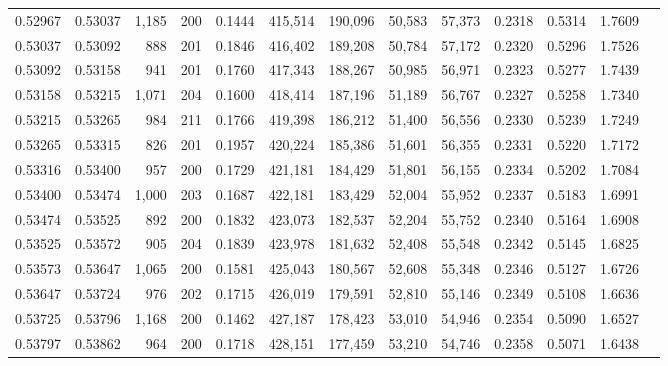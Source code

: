 \begin{tabular}{rrrrrrrrrrrrr}
0.52967 & 0.53037 & 1,185 & 200 &                                     0.1444 & 415,514 & 190,096 &  50,583 &  57,373 & 0.2318 & 0.5314 & 1.7609 \\
0.53037 & 0.53092 &   888 & 201 &                                     0.1846 & 416,402 & 189,208 &  50,784 &  57,172 & 0.2320 & 0.5296 & 1.7526 \\
0.53092 & 0.53158 &   941 & 201 &                                     0.1760 & 417,343 & 188,267 &  50,985 &  56,971 & 0.2323 & 0.5277 & 1.7439 \\
0.53158 & 0.53215 & 1,071 & 204 &                                     0.1600 & 418,414 & 187,196 &  51,189 &  56,767 & 0.2327 & 0.5258 & 1.7340 \\
0.53215 & 0.53265 &   984 & 211 &                                     0.1766 & 419,398 & 186,212 &  51,400 &  56,556 & 0.2330 & 0.5239 & 1.7249 \\
0.53265 & 0.53315 &   826 & 201 &                                     0.1957 & 420,224 & 185,386 &  51,601 &  56,355 & 0.2331 & 0.5220 & 1.7172 \\
0.53316 & 0.53400 &   957 & 200 &                                     0.1729 & 421,181 & 184,429 &  51,801 &  56,155 & 0.2334 & 0.5202 & 1.7084 \\
0.53400 & 0.53474 & 1,000 & 203 &                                     0.1687 & 422,181 & 183,429 &  52,004 &  55,952 & 0.2337 & 0.5183 & 1.6991 \\
0.53474 & 0.53525 &   892 & 200 &                                     0.1832 & 423,073 & 182,537 &  52,204 &  55,752 & 0.2340 & 0.5164 & 1.6908 \\
0.53525 & 0.53572 &   905 & 204 &                                     0.1839 & 423,978 & 181,632 &  52,408 &  55,548 & 0.2342 & 0.5145 & 1.6825 \\
0.53573 & 0.53647 & 1,065 & 200 &                                     0.1581 & 425,043 & 180,567 &  52,608 &  55,348 & 0.2346 & 0.5127 & 1.6726 \\
0.53647 & 0.53724 &   976 & 202 &                                     0.1715 & 426,019 & 179,591 &  52,810 &  55,146 & 0.2349 & 0.5108 & 1.6636 \\
0.53725 & 0.53796 & 1,168 & 200 &                                     0.1462 & 427,187 & 178,423 &  53,010 &  54,946 & 0.2354 & 0.5090 & 1.6527 \\
0.53797 & 0.53862 &   964 & 200 &                                     0.1718 & 428,151 & 177,459 &  53,210 &  54,746 & 0.2358 & 0.5071 & 1.6438 \\

\end{tabular}
